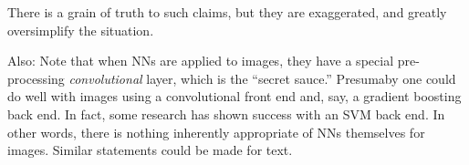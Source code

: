 There is a grain of truth to such claims, but they are exaggerated, and
greatly oversimplify the situation.

Also:  Note that when NNs are applied to images, they have a special
pre-processing \textit{convolutional} layer, which is the ``secret
sauce.'' Presumaby one could do well with images using a convolutional
front end and, say, a gradient boosting back end.  In fact, some
research has shown success with an SVM back end.  In other words, there
is nothing inherently appropriate of NNs themselves for images.  Similar
statements could be made for text.

